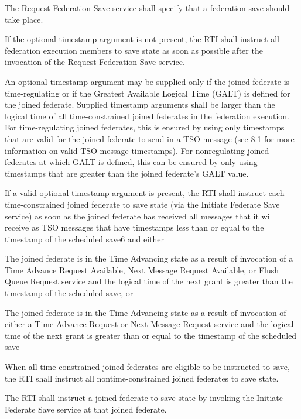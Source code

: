 The Request Federation Save service shall specify that a federation save should take place.

If the optional timestamp argument is not present, the RTI shall instruct all federation execution members to save state as soon as possible after the invocation of the Request Federation Save service.

\clearpage

An optional timestamp argument may be supplied only if the joined federate is time-regulating or if the Greatest Available Logical Time (GALT) is defined for the joined federate. Supplied timestamp arguments shall be larger than the logical time of all time-constrained joined federates in the federation execution. For time-regulating joined federates, this is ensured by using only timestamps that are valid for the joined federate to send in a TSO message (see 8.1 for more information on valid TSO message timestamps). For nonregulating joined federates at which GALT is defined, this can be ensured by only using timestamps that are greater than the joined federate's GALT value.

If a valid optional timestamp argument is present, the RTI shall instruct each time-constrained joined federate to save state (via the Initiate Federate Save \rtiinitiated{} service) as soon as the joined federate has received all messages that it will receive as TSO messages that have timestamps less than or equal to the timestamp of the scheduled save6 and either

\begin{stddashlist}
    \item The joined federate is in the Time Advancing state as a result of invocation of a Time Advance Request Available, Next Message Request Available, or Flush Queue Request service and the logical time of the next grant is greater than the timestamp of the scheduled save, or
    \item The joined federate is in the Time Advancing state as a result of invocation of either a Time Advance Request or Next Message Request service and the logical time of the next grant is greater than or equal to the timestamp of the scheduled save
\end{stddashlist}

When all time-constrained joined federates are eligible to be instructed to save, the RTI shall instruct all nontime-constrained joined federates to save state.

The RTI shall instruct a joined federate to save state by invoking the Initiate Federate Save \rtiinitiated{} service at that joined federate.

